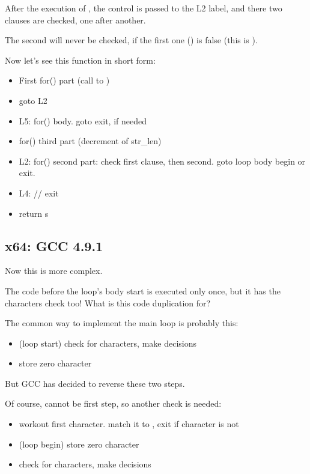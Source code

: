 After the execution of \strlen{}, the control is passed to the L2 label, 
and there two clauses are checked, one after another.

The second will never be checked, if the first one () is false 
(this is ).

Now let's see this function in short form:

\begin{itemize}
\item First for() part (call to \strlen{})
\item goto L2
\item L5: for() body. goto exit, if needed
\item for() third part (decrement of str\_len)
\item L2: 
for() second part: check first clause, then second. goto loop body begin or exit.
\item L4: // exit
\item return s
\end{itemize}

\subsection{x64: \Optimizing GCC 4.9.1}
\label{string_trim_GCC_x64_O3}



Now this is more complex.

The code before the loop's body start is executed only once, but it has the \CRLF{} 
characters check too!
What is this code duplication for?

The common way to implement the main loop is probably this:

\begin{itemize}
\item (loop start) check for 
\CRLF{} characters, make decisions
\item store zero character
\end{itemize}

But GCC has decided to reverse these two steps. 

Of course,  cannot be first step, so another check is needed:

\begin{itemize}
\item workout first character. match it to \CRLF{}, exit if character is not \CRLF{}

\item (loop begin) store zero character

\item check for \CRLF{} characters, make decisions
\end{itemize}

